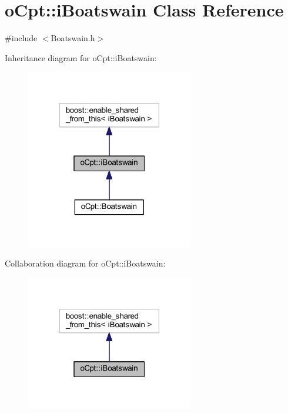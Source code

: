 \hypertarget{classo_cpt_1_1i_boatswain}{}\section{o\+Cpt\+:\+:i\+Boatswain Class Reference}
\label{classo_cpt_1_1i_boatswain}


{\ttfamily \#include $<$Boatswain.\+h$>$}



Inheritance diagram for o\+Cpt\+:\+:i\+Boatswain\+:
\nopagebreak
\begin{figure}[H]
\begin{center}
\leavevmode
\includegraphics[width=207pt]{classo_cpt_1_1i_boatswain__inherit__graph}
\end{center}
\end{figure}


Collaboration diagram for o\+Cpt\+:\+:i\+Boatswain\+:
\nopagebreak
\begin{figure}[H]
\begin{center}
\leavevmode
\includegraphics[width=207pt]{classo_cpt_1_1i_boatswain__coll__graph}
\end{center}
\end{figure}

